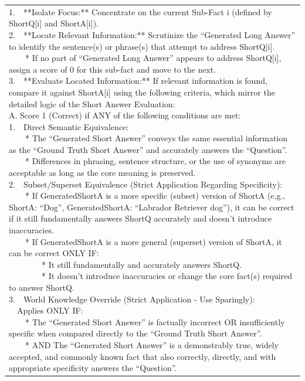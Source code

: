 \documentclass[11pt]{article}
\begin{document}
\begin{table}[t]
\begin{tabular}{@{}p{\textwidth}@{}}
{1.\ \ **Isolate Focus:** Concentrate on the current Sub-Fact i (defined by ShortQ[i] and ShortA[i]).\\
2.\ \ **Locate Relevant Information:** Scrutinize the ``Generated Long Answer'' to identify the sentence(s) or phrase(s) that attempt to address ShortQ[i].\\
\ \ \ \ * If no part of ``Generated Long Answer'' appears to address ShortQ[i], assign a score of 0 for this sub-fact and move to the next.\\
3.\ \ **Evaluate Located Information:** If relevant information is found, compare it against ShortA[i] using the following criteria, which mirror the detailed logic of the Short Answer Evaluation:\\
A. Score 1 (Correct) if ANY of the following conditions are met:\\
1.\ \ Direct Semantic Equivalence:\\
\ \ \ \ * The ``Generated Short Answer'' conveys the same essential information as the ``Ground Truth Short Answer'' and accurately answers the ``Question''.\\
\ \ \ \ * Differences in phrasing, sentence structure, or the use of synonyms are acceptable as long as the core meaning is preserved.\\
2.\ \ Subset/Superset Equivalence (Strict Application Regarding Specificity):\\
\ \ \ \ * If GeneratedShortA is a more specific (subset) version of ShortA (e.g., ShortA: ``Dog'', GeneratedShortA: ``Labrador Retriever dog''), it can be correct if it still fundamentally answers ShortQ accurately and doesn't introduce inaccuracies.\\
\ \ \ \ * If GeneratedShortA is a more general (superset) version of ShortA, it can be correct ONLY IF:\\
\ \ \ \ \ \ \ \ * It still fundamentally and accurately answers ShortQ.\\
\ \ \ \ \ \ \ \ * It doesn't introduce inaccuracies or change the core fact(s) required to answer ShortQ.\\
3.\ \ World Knowledge Override (Strict Application - Use Sparingly):\\
\ \ Applies ONLY IF:\\
\ \ \ \ * The ``Generated Short Answer'' is factually incorrect OR insufficiently specific when compared directly to the ``Ground Truth Short Answer''.\\
\ \ \ \ * AND The ``Generated Short Answer'' is a demonstrably true, widely accepted, and commonly known fact that also correctly, directly, and with appropriate specificity answers the ``Question''.\\
}
\end{tabular}
\end{table}
\end{document}
